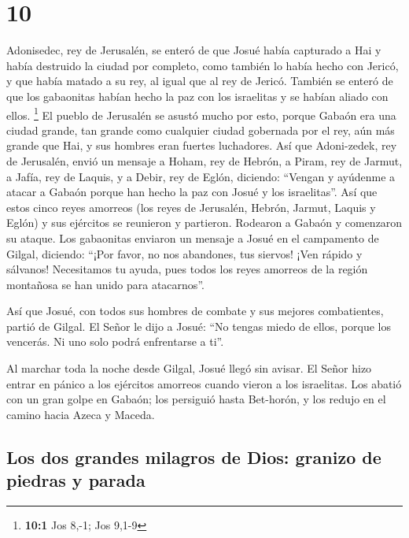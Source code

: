 \hypertarget{section-9}{%
\section{10}\label{section-9}}

 Adonisedec, rey de Jerusalén, se enteró de que Josué
había capturado a Hai y había destruido la ciudad por completo, como
también lo había hecho con Jericó, y que había matado a su rey, al igual
que al rey de Jericó. También se enteró de que los gabaonitas habían
hecho la paz con los israelitas y se habían aliado con ellos.
\footnote{\textbf{10:1} Jos 8,-1; Jos 9,1-9}  El pueblo de
Jerusalén se asustó mucho por esto, porque Gabaón era una ciudad grande,
tan grande como cualquier ciudad gobernada por el rey, aún más grande
que Hai, y sus hombres eran fuertes luchadores.  Así que
Adoni-zedek, rey de Jerusalén, envió un mensaje a Hoham, rey de Hebrón,
a Piram, rey de Jarmut, a Jafía, rey de Laquis, y a Debir, rey de Eglón,
diciendo:  ``Vengan y ayúdenme a atacar a Gabaón porque
han hecho la paz con Josué y los israelitas''.  Así que
estos cinco reyes amorreos (los reyes de Jerusalén, Hebrón, Jarmut,
Laquis y Eglón) y sus ejércitos se reunieron y partieron. Rodearon a
Gabaón y comenzaron su ataque.  Los gabaonitas enviaron un
mensaje a Josué en el campamento de Gilgal, diciendo: ``¡Por favor, no
nos abandones, tus siervos! ¡Ven rápido y sálvanos! Necesitamos tu
ayuda, pues todos los reyes amorreos de la región montañosa se han unido
para atacarnos''.

 Así que Josué, con todos sus hombres de combate y sus
mejores combatientes, partió de Gilgal.  El Señor le dijo
a Josué: ``No tengas miedo de ellos, porque los vencerás. Ni uno solo
podrá enfrentarse a ti''.

 Al marchar toda la noche desde Gilgal, Josué llegó sin
avisar.  El Señor hizo entrar en pánico a los ejércitos
amorreos cuando vieron a los israelitas. Los abatió con un gran golpe en
Gabaón; los persiguió hasta Bet-horón, y los redujo en el camino hacia
Azeca y Maceda.

\hypertarget{los-dos-grandes-milagros-de-dios-granizo-de-piedras-y-parada}{%
\subsection{Los dos grandes milagros de Dios: granizo de piedras y
parada}\label{los-dos-grandes-milagros-de-dios-granizo-de-piedras-y-parada}}

